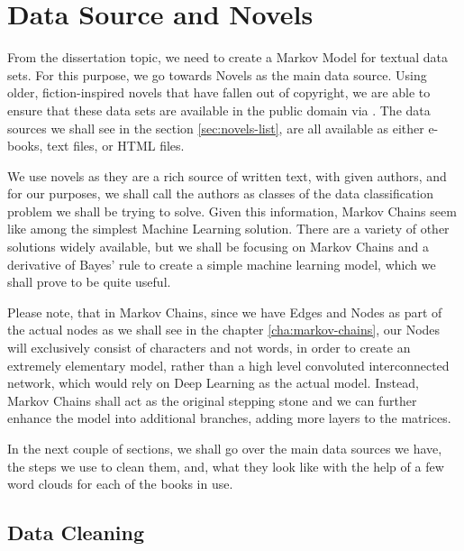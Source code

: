
\chapter{Data Source and Novels} %
\label{cha:novels-why} %

From the dissertation topic, we need to create a Markov Model for textual data sets. For this purpose, we go towards Novels as the main data source. Using older, fiction-inspired novels that have fallen out of copyright, we are able to ensure that these data sets are available in the public domain via \textcite{project-gutenburg}. The data sources we shall see in the section \ref{sec:novels-list}, are all available as either e-books, text files, or HTML files. 

We use novels as they are a rich source of written text, with given authors, and for our purposes, we shall call the authors as classes of the data classification problem we shall be trying to solve. Given this information, Markov Chains seem like among the simplest Machine Learning solution. There are a variety of other solutions widely available, but we shall be focusing on Markov Chains and a derivative of Bayes' rule to create a simple machine learning model, which we shall prove to be quite useful.

Please note, that in Markov Chains, since we have Edges and Nodes as part of the actual nodes as we shall see in the chapter \ref{cha:markov-chains}, our Nodes will exclusively consist of characters and not words, in order to create an extremely elementary model, rather than a high level convoluted interconnected network, which would rely on Deep Learning as the actual model. Instead, Markov Chains shall act as the original stepping stone and we can further enhance the model into additional branches, adding more layers to the matrices.

In the next couple of sections, we shall go over the main data sources we have, the steps we use to clean them, and, what they look like with the help of a few word clouds for each of the books in use.

\section{Data Cleaning}
\label{sec:data-cleaning}

